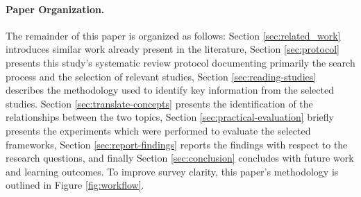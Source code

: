 


\paragraph{Paper Organization.}
The remainder of this paper is organized as follows: Section \ref{sec:related_work} introduces
similar work already present in the literature, Section \ref{sec:protocol} presents this study's
systematic review protocol documenting primarily the search process and the selection of relevant
studies, Section \ref{sec:reading-studies} describes the methodology used to identify key
information from the selected studies. Section \ref{sec:translate-concepts} presents the
identification of the relationships between the two topics, Section \ref{sec:practical-evaluation}
briefly presents the experiments which were performed to evaluate the selected frameworks, Section
\ref{sec:report-findings} reports the findings with respect to the research questions, and finally
Section \ref{sec:conclusion} concludes with future work and learning outcomes.
To improve survey clarity, this paper's methodology is outlined in Figure \ref{fig:workflow}.
